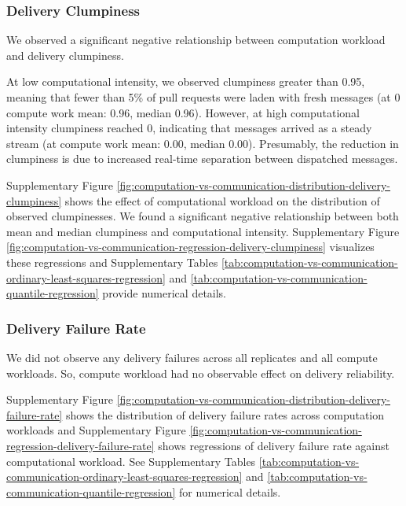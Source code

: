 \subsubsection{Delivery Clumpiness}

We observed a significant negative relationship between computation workload and delivery clumpiness.

At low computational intensity, we observed clumpiness greater than 0.95, meaning that fewer than 5\% of pull requests were laden with fresh messages (at 0 compute work mean: 0.96, median 0.96).
However, at high computational intensity clumpiness reached 0, indicating that messages arrived as a steady stream (at  compute work mean: 0.00, median 0.00).
Presumably, the reduction in clumpiness is due to increased real-time separation between dispatched messages.

Supplementary Figure \ref{fig:computation-vs-communication-distribution-delivery-clumpiness} shows the effect of computational workload on the distribution of observed clumpinesses.
We found a significant negative relationship between both mean and median clumpiness and computational intensity.
Supplementary Figure \ref{fig:computation-vs-communication-regression-delivery-clumpiness} visualizes these regressions and Supplementary Tables \ref{tab:computation-vs-communication-ordinary-least-squares-regression} and \ref{tab:computation-vs-communication-quantile-regression} provide numerical details.

\subsubsection{Delivery Failure Rate}

We did not observe any delivery failures across all replicates and all compute workloads.
So, compute workload had no observable effect on delivery reliability.

Supplementary Figure \ref{fig:computation-vs-communication-distribution-delivery-failure-rate} shows the distribution of delivery failure rates across computation workloads and Supplementary Figure \ref{fig:computation-vs-communication-regression-delivery-failure-rate} shows regressions of delivery failure rate against computational workload.
See Supplementary Tables \ref{tab:computation-vs-communication-ordinary-least-squares-regression} and \ref{tab:computation-vs-communication-quantile-regression} for numerical details.
